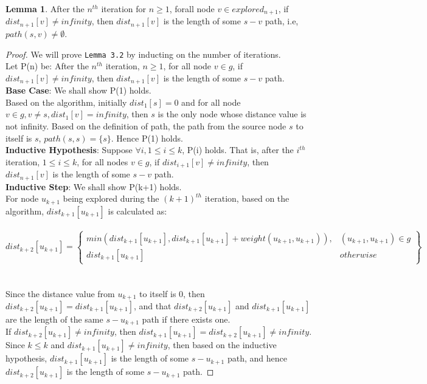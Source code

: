 \documentclass[11pt, oneside]{article}   	%
\newcommand\tab[1][1cm]{\hspace*{#1}}
\theoremstyle{definition}
\newtheorem{sublemma}{Lemma}[section]
\begin{document}
\begin{sublemma}
After the $n^{th}$ iteration for $n \geq 1$, forall node $v \in explored_{n+1}$, if $dist_{n+1}[v] \neq infinity$, then $dist_{n+1}[v]$ is the length of some $s-v$ path, i.e, $path(s, v) \neq \emptyset$.  
\end{sublemma}
\begin{proof}
We will prove \texttt{Lemma 3.2} by inducting on the number of iterations. 
\\
Let P(n) be: After the $n^{th}$ iteration, $n \geq 1$, for all node $v \in g$, if $dist_{n+1}[v] \neq infinity$, then $dist_{n+1}[v]$ is the length of some $s-v$ path. 
\\
\textbf{Base Case}: We shall show P(1) holds. 
\\
Based on the algorithm, initially $dist_1[s] = 0$ and for all node $v \in g, v \neq s, dist_1[v] = infinity$, then $s$ is the only node whose distance value is not infinity. Based on the definition of path, the path from the source node $s$ to itself is $s$, $path(s, s) = \{s\}$. Hence P(1) holds. 
\\
\textbf{Inductive Hypothesis}: Suppose $\forall i, 1 \leq i \leq k$, P(i) holds. That is, after the $i^{th}$ iteration, $1 \leq i \leq k$, for all nodes $v \in g$, if $dist_{i+1}[v] \neq infinity$, then $dist_{n+1}[v]$ is the length of some $s-v$ path. 
\\
\textbf{Inductive Step}: We shall show P(k+1) holds.
\\
For node $u_{k+1}$ being explored during the $(k+1)^{th}$ iteration, based on the algorithm, $dist_{k+1}[u_{k+1}]$ is calculated as: 
\\\\
\tab\[
        dist_{k+2}[u_{k+1}] = \left.
       \begin{cases} 
          min(dist_{k+1}[u_{k+1}], dist_{k+1}[u_{k+1}] + weight(u_{k+1},u_{k+1})), & (u_{k+1},u_{k+1}) \in g \\ 
          dist_{k+1}[u_{k+1}] & otherwise 
        \end{cases}
        \right\}
      \]
\\\\
Since the distance value from $u_{k+1}$ to itself is $0$, then $dist_{k+2}[u_{k+1}] = dist_{k+1}[u_{k+1}]$, and that $dist_{k+2}[u_{k+1}]$ and $dist_{k+1}[u_{k+1}]$ are the length of the same $s-u_{k+1}$ path if there exists one. 
\\
If $dist_{k+2}[u_{k+1}] \neq infinity$, then $dist_{k+1}[u_{k+1}] = dist_{k+2}[u_{k+1}] \neq infinity$. Since $k \leq k$ and $dist_{k+1}[u_{k+1}] \neq infinity$, then based on the inductive hypothesis, $dist_{k+1}[u_{k+1}]$ is the length of some $s-u_{k+1}$ path, and hence $dist_{k+2}[u_{k+1}]$ is the length of some $s-u_{k+1}$ path.

\end{proof}
\end{document}
